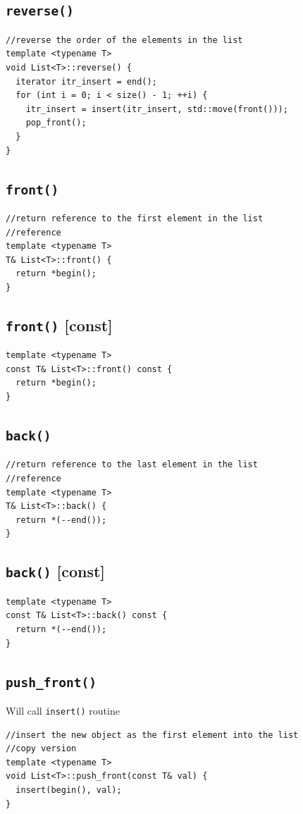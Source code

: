 \documentclass[12pt]{book}
\begin{document}
\subsection{\texttt{reverse()}}
\label{sec:org004aa25}
\begin{verbatim}
//reverse the order of the elements in the list
template <typename T>
void List<T>::reverse() {
  iterator itr_insert = end();
  for (int i = 0; i < size() - 1; ++i) {
    itr_insert = insert(itr_insert, std::move(front()));
    pop_front();
  }
}
\end{verbatim}
\subsection{\texttt{front()}}
\label{sec:org07ca41b}
\begin{verbatim}
//return reference to the first element in the list
//reference
template <typename T>
T& List<T>::front() {
  return *begin();
}
\end{verbatim}
\subsection{\texttt{front()} [const]}
\label{sec:org1542283}
\begin{verbatim}
template <typename T>
const T& List<T>::front() const {
  return *begin();
}
\end{verbatim}
\subsection{\texttt{back()}}
\label{sec:orgca65fae}
\begin{verbatim}
//return reference to the last element in the list
//reference 
template <typename T>
T& List<T>::back() {
  return *(--end());
}
\end{verbatim}
\subsection{\texttt{back()} [const]}
\label{sec:orgfe75ede}
\begin{verbatim}
template <typename T>
const T& List<T>::back() const {
  return *(--end());
}
\end{verbatim}
\subsection{\texttt{push\_front()}}
\label{sec:orgd6aba10}
Will call \texttt{insert()} routine
\begin{verbatim}
//insert the new object as the first element into the list
//copy version 
template <typename T>
void List<T>::push_front(const T& val) {
  insert(begin(), val);
}
\end{verbatim}
\end{document}
